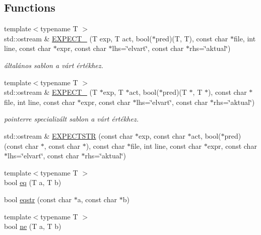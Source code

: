 \subsection*{Functions}
\begin{DoxyCompactItemize}
\item 
{\footnotesize template$<$typename T $>$ }\\std\+::ostream \& \hyperlink{namespacegtest__lite_ab358c162e1cedfc39abf5959417ffc1e}{E\+X\+P\+E\+C\+T\+\_\+} (T exp, T act, bool($\ast$pred)(T, T), const char $\ast$file, int line, const char $\ast$expr, const char $\ast$lhs=\char`\"{}elvart\char`\"{}, const char $\ast$rhs=\char`\"{}aktual\char`\"{})
\begin{DoxyCompactList}\small\item\em általános sablon a várt értékhez. \end{DoxyCompactList}\item 
{\footnotesize template$<$typename T $>$ }\\std\+::ostream \& \hyperlink{namespacegtest__lite_a8b21cff4e93dcacdd1b4fdb8b6b9c740}{E\+X\+P\+E\+C\+T\+\_\+} (T $\ast$exp, T $\ast$act, bool($\ast$pred)(T $\ast$, T $\ast$), const char $\ast$file, int line, const char $\ast$expr, const char $\ast$lhs=\char`\"{}elvart\char`\"{}, const char $\ast$rhs=\char`\"{}aktual\char`\"{})
\begin{DoxyCompactList}\small\item\em pointerre specializált sablon a várt értékhez. \end{DoxyCompactList}\item 
std\+::ostream \& \hyperlink{namespacegtest__lite_aea477921e4c26d2a2806bc3011066270}{E\+X\+P\+E\+C\+T\+S\+TR} (const char $\ast$exp, const char $\ast$act, bool($\ast$pred)(const char $\ast$, const char $\ast$), const char $\ast$file, int line, const char $\ast$expr, const char $\ast$lhs=\char`\"{}elvart\char`\"{}, const char $\ast$rhs=\char`\"{}aktual\char`\"{})
\item 
{\footnotesize template$<$typename T $>$ }\\bool \hyperlink{namespacegtest__lite_aa7762f23094d59c699ec402e1a37640c}{eq} (T a, T b)
\item 
bool \hyperlink{namespacegtest__lite_a34055f353dabbe4ed9063f1d36af6022}{eqstr} (const char $\ast$a, const char $\ast$b)
\item 
{\footnotesize template$<$typename T $>$ }\\bool \hyperlink{namespacegtest__lite_a9a1485affebbed604f7cac69f70072dc}{ne} (T a, T b)
\item 

\end{DoxyCompactItemize}
